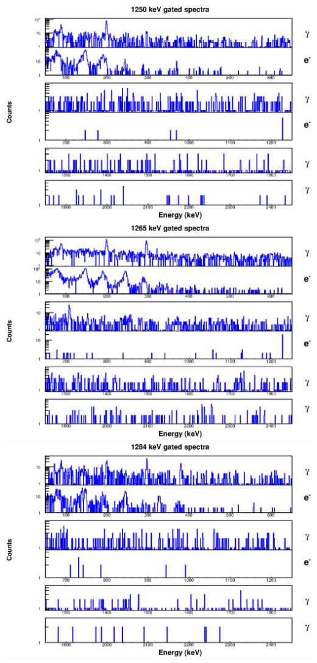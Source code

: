 \begin{landscape}
\includegraphics[scale=1.1]{156Gd_Appendix/1250_combined.eps}
\includegraphics[scale=1.1]{156Gd_Appendix/1265_combined.eps}
\includegraphics[scale=1.1]{156Gd_Appendix/1284_combined.eps}

\end{landscape}
